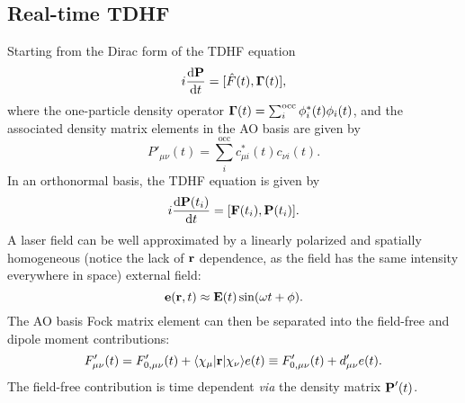\documentclass{article}
\begin{document}
\subsection{Real-time TDHF}
Starting from the Dirac form of the TDHF equation
\begin{equation}
    i\diff{\bvec{P}}{t}=[\hat{F}(t),\bvec{\Gamma}(t)],
\end{equation}
where the one-particle density operator $\bm{\mathrm{\Gamma}}(t)=\sum_i^{\mathrm{occ}}\phi_i^*(t)\phi_i(t)$, and the associated density matrix elements in the AO basis are given by
\begin{equation}
    P'_{\mu\nu}(t)=\sum_i^{\mathrm{occ}}c_{\mu i}^*(t)c_{\nu i}(t).
\end{equation}
In an orthonormal basis, the TDHF equation is given by
\begin{equation}
    i\diff{\bvec{P}(t_i)}{t}=[\bvec{F}(t_i),\bvec{P}(t_i)].
\end{equation}
A laser field can be well approximated by a linearly polarized and spatially homogeneous (notice the lack of $\bm{\mathrm{r}}$ dependence, as the field has the same intensity everywhere in space) external field:
\begin{equation}
    \bm{\mathrm{e}}(\bm{\mathrm{r}},t)\approx\bm{\mathrm{E}}(t)\sin(\omega t+\phi).
\end{equation}
The AO basis Fock matrix element can then be separated into the field-free and dipole moment contributions:
\begin{equation}
    F'_{\mu\nu}(t)=F'_{0,\mu\nu}(t)+\langle\chi_{\mu}|\bm{\mathrm{r}}|\chi_{\nu}\rangle e(t)\equiv F'_{0,\mu\nu}(t)+d'_{\mu\nu} e(t).
\end{equation}
The field-free contribution is time dependent \textit{via} the density matrix $\bm{\mathrm{P}}'(t)$.
\end{document}
